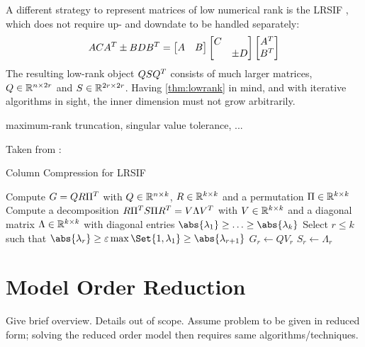 A different strategy to represent matrices of low numerical rank is the \ac{LRSIF} \cite{Benner2009,Lang2015},
which does not require up- and downdate to be handled separately:
\begin{equation}
  ACA^T \pm BDB^T =
  \begin{bmatrix}
    A & B
  \end{bmatrix}
  \begin{bmatrix}
    C \\ & \pm D
  \end{bmatrix}
  \begin{bmatrix}
    A^T \\ B^T
  \end{bmatrix}
\end{equation}
The resulting low-rank object $QSQ^T$ consists of much larger matrices,
$Q \in\mathbb{R}^{n\times 2r}$ and $S\in\mathbb{R}^{2r\times 2r}$.
Having \autoref{thm:lowrank} in mind,
and with iterative algorithms in sight,
the inner dimension must not grow arbitrarily.

maximum-rank truncation,
singular value tolerance,
...

Taken from \cite[Section 6.3.3]{Lang2017}:
\begin{algorithm}[h]
  \caption{Column Compression for LRSIF}
  \label{alg:lowrank:compression}
  Compute $G=QR\Pi^T$ with $Q\in\mathbb{R}^{n\times k}$, $R\in\mathbb{R}^{k\times k}$ and a permutation $\Pi\in\mathbb{R}^{k\times k}$\;
  Compute a decomposition $R \Pi^T S \Pi R^T = V \Lambda V^T$ with $V \in \mathbb{R}^{k\times k}$
  and a diagonal matrix $\Lambda\in\mathbb{R}^{k\times k}$ with diagonal entries $\abs{\lambda_1}\geq\ldots\geq\abs{\lambda_k}$\;
  Select $r \leq k$ such that $\abs{\lambda_r} \geq \epsilon\max\Set{1, \lambda_1} \geq \abs{\lambda_{r+1}}$\;
  $G_r \gets Q V_r$\;
  $S_r \gets \Lambda_r$\;
\end{algorithm}

\section{Model Order Reduction}
Give brief overview.
Details out of scope.
Assume problem to be given in reduced form;
solving the reduced order model then requires same algorithms/techniques.
